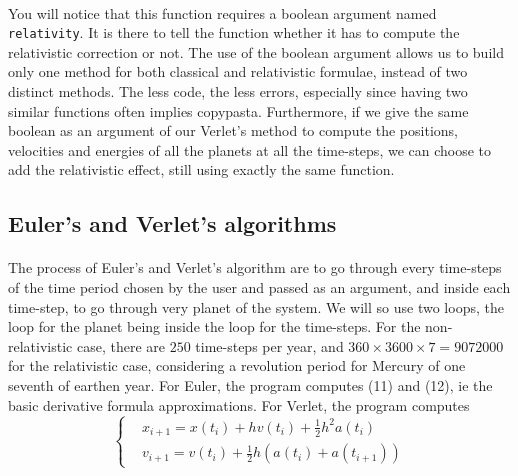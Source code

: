 \documentclass[a4paper, twoside, 11pt]{report}
\theoremstyle{theorem}
\theoremstyle{remark}
\theoremstyle{exemple}
\begin{document}
				\paragraph{}You will notice that this function requires a boolean argument named \texttt{relativity}. It is there to tell the function whether it has to compute the relativistic correction or not. The use of the boolean argument allows us to build only one method for both classical and relativistic formulae, instead of two distinct methods. The less code, the less errors, especially since having two similar functions often implies copypasta. Furthermore, if we give the same boolean as an argument of our Verlet's method to compute the positions, velocities and energies of all the planets at all the time-steps, we can choose to add the relativistic effect, still using exactly the same function.
				
			\subsection{Euler's and Verlet's algorithms}
			
				\paragraph{}The process of Euler's and Verlet's algorithm are to go through every time-steps of the time period chosen by the user and passed as an argument, and inside each time-step, to go through very planet of the system. We will so use two loops, the loop for the planet being inside the loop for the time-steps. For the non-relativistic case, there are $250$ time-steps per year, and $360\times3600\times7=9072000$ for the relativistic case, considering a revolution period for Mercury of one seventh of earthen year. For Euler, the program computes (11) and (12), ie the basic derivative formula approximations. For Verlet, the program computes 
				\begin{equation*}
                    \left\{
                        \begin{aligned}
                            &x_{i+1} = x(t_i) + hv(t_i) + \frac{1}{2}h^2 a(t_i) \\
                            &v_{i+1} = v(t_i) + \frac{1}{2}h\left(a(t_i) + a(t_{i+1})\right)
                        \end{aligned}
                    \right.
                \end{equation*}
                
\end{document}
